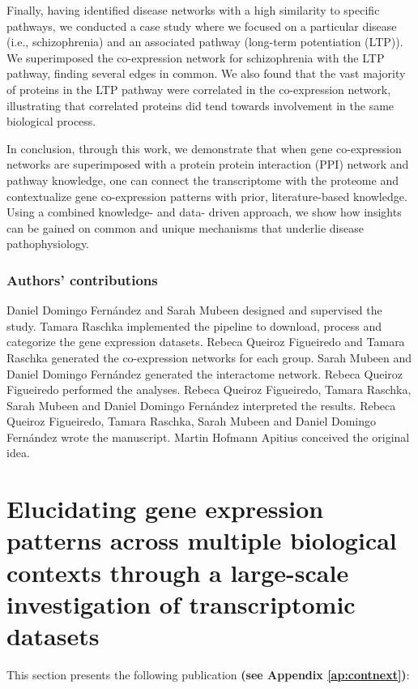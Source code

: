 Finally, having identified disease networks with a high similarity to specific pathways, we conducted a case study where we focused on a particular disease (i.e., schizophrenia) and an associated pathway (long-term potentiation (LTP)). We superimposed the co-expression network for schizophrenia with the LTP pathway, finding several edges in common. We also found that the vast majority of proteins in the LTP pathway were correlated in the co-expression network, illustrating that correlated proteins did tend towards involvement in the same biological process.

In conclusion, through this work, we demonstrate that when gene co-expression networks are superimposed with a protein protein interaction (PPI) network and pathway knowledge, one can connect the transcriptome with the proteome and contextualize gene co-expression patterns with prior, literature-based knowledge. Using a combined knowledge- and data- driven approach, we show how insights can be gained on common and unique mechanisms that underlie disease pathophysiology. 

\subsubsection{Authors' contributions}

Daniel Domingo Fernández and Sarah Mubeen designed and supervised the study. Tamara Raschka implemented the pipeline to download, process and categorize the gene expression datasets. Rebeca Queiroz Figueiredo and Tamara Raschka generated the co-expression networks for each group. Sarah Mubeen and Daniel Domingo Fernández generated the interactome network. Rebeca Queiroz Figueiredo performed the analyses. Rebeca Queiroz Figueiredo, Tamara Raschka, Sarah Mubeen and Daniel Domingo Fernández interpreted the results. Rebeca Queiroz Figueiredo, Tamara Raschka, Sarah Mubeen and Daniel Domingo Fernández wrote the manuscript. Martin Hofmann Apitius conceived the original idea. 


\section{Elucidating gene expression patterns across multiple biological contexts through a large-scale investigation of transcriptomic datasets}

\label{ch:contnext}
 
This section presents the following publication \textbf{(see Appendix \ref{ap:contnext})}:

